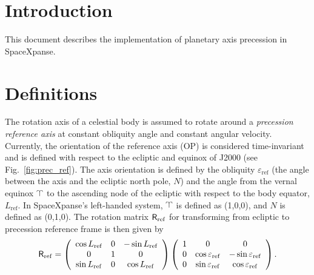 \documentclass[a4paper]{article}
\renewcommand{\vec}[1]{\ensuremath \mathbf{#1}}
\newcommand{\mat}[1]{\ensuremath \mathsf{#1}}
\begin{document}



\newcommand{\vR}[1]{\ensuremath{\vec{R}_{#1}}}
\newcommand{\nR}[1]{\ensuremath{|\vR{#1}|}}

\maketitle

\section{Introduction}
This document describes the implementation of planetary axis precession in SpaceXpanse.

\section{Definitions}
The rotation axis of a celestial body is assumed to rotate around a \emph{precession reference axis} at constant obliquity angle and constant angular velocity. Currently, the orientation of the reference axis (OP) is considered time-invariant and is defined with respect to the ecliptic and equinox of J2000 (see Fig.~\ref{fig:prec_ref}). The axis orientation is defined by the obliquity $\varepsilon_\mathrm{ref}$ (the angle between the axis and the ecliptic north pole, $N$) and the angle from the vernal equinox  $\vernal$ to the ascending node of the ecliptic with respect to the body equator, $L_\mathrm{ref}$.
In SpaceXpanse's left-handed system, $\vernal$ is defined as (1,0,0), and $N$ is defined as (0,1,0). The rotation matrix $\mat{R}_\mathrm{ref}$ for transforming from ecliptic to precession reference frame is then given by
\begin{equation}
\mat{R}_\mathrm{ref} = \left( \begin{array}{ccc}
\cos L_\mathrm{ref} & 0 & -\sin L_\mathrm{ref} \\
0 & 1 & 0 \\
\sin L_\mathrm{ref} & 0 & \cos L_\mathrm{ref} \end{array} \right)
\left( \begin{array}{ccc}
1 & 0 & 0 \\
0 & \cos\varepsilon_\mathrm{ref} & -\sin\varepsilon_\mathrm{ref} \\
0  & \sin\varepsilon_\mathrm{ref} & \cos\varepsilon_\mathrm{ref}
\end{array} \right).
\end{equation}
\end{document}
